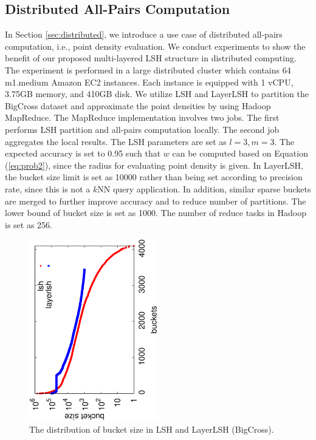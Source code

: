 \subsection{Distributed All-Pairs Computation}
\label{sec:expr:allpair}

In Section \ref{sec:distributed}, we introduce a use case of distributed all-pairs computation, i.e., point density evaluation. We conduct experiments to show the benefit of our proposed multi-layered LSH structure in distributed computing. The experiment is performed in a large distributed cluster which contains 64 m1.medium Amazon EC2 instances. Each instance is equipped with 1 vCPU, 3.75GB memory, and 410GB disk. We utilize LSH and LayerLSH to partition the BigCross dataset and approximate the point densities by using Hadoop MapReduce. The MapReduce implementation involves two jobs. The first performs LSH partition and all-pairs computation locally. The second job aggregates the local results. The LSH parameters are set as $l=3, m=3$. The expected accuracy is set to 0.95 such that $w$ can be computed based on Equation (\ref{eq:prob2}), since the radius for evaluating point density is given. In LayerLSH, the bucket size limit is set as 10000 rather than being set according to precision rate, since this is not a $k$NN query application. In addition, similar sparse buckets are merged to further improve accuracy and to reduce number of partitions. The lower bound of bucket size is set as 1000. The number of reduce tasks in Hadoop is set as 256.

\begin{figure}[t]
    \centerline{\includegraphics[angle=-90, width=2.2in]{fig/amazon_buckets.eps}}
    \caption{The distribution of bucket size in LSH and LayerLSH (BigCross).}
    \label{fig:amazon_buckets}
\end{figure}

